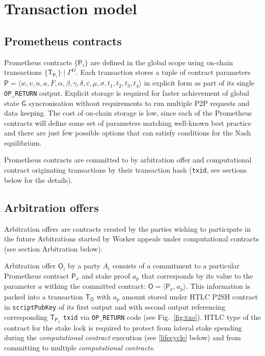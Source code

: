 \documentclass[a4paper]{article}
\begin{document}
\section{Transaction model}
\label{transaction_model}

\subsection{Prometheus contracts}
\label{p_contracts}

Prometheus contracts $\{\mathsf{P}_i\}$ are defined in the global scope using on-chain transactions $\{ \mathsf{T}_{\mathsf{P}_i} \} \mid\Gamma^\Omega$. Each transaction stores a tuple of contract parameters $\mathsf{P} = \langle w, v, n, a, F, \alpha, \beta,  \gamma, \delta, \varepsilon, \mu, \sigma, t_1, t_2, t_3, t_4 \rangle$ in explicit form as part of its single \texttt{OP\_RETURN} output. Explicit storage is required for faster achievement of global state $\mathsf{G}$ syncronisation without requirements to run multiple P2P requests and data keeping. The cost of on-chain storage is low, since each of the Prometheus contracts will define some set of parameters matching well-known best practice and there are just few possible options that can satisfy conditions for the Nash equilibrium.

Prometheus contracts are committed to by arbitration offer and computational contract originating transactions by their transaction hash (\texttt{txid}, see sections below for the details).

\subsection{Arbitration offers}
\label{o_contracts}

Arbitration offers are contracts created by the parties wishing to participate in the future Arbitrations started by Worker appeals under computational contracts (see section Arbitration below).

Arbitration offer $\mathsf{O}_i$ by a party $A_i$ consists of a commitment to a particular Prometheus contract $\mathsf{P}_x$ and stake proof $a_p$ that corresponds by its value to the parameter $a$ withing the committed contract: $\mathsf{O} = \langle \mathsf{P}_x, a_p \rangle$. This information is packed into a transaction $\mathsf{T_O}$ with $a_p$ amount stored under HTLC P2SH contract in \texttt{scriptPubKey} of its first output and with second output referencing corresponding $\mathsf{T}_{\mathsf{P}_x}$ \texttt{txid} via \texttt{OP\_RETURN}  code (see Fig.~\ref{fig:txo}). HTLC type of the contract for the stake lock is required to protect from lateral stake spending during the \textit{computational contract} execution (see \ref{lifecycle} below) and from committing to multiple \textit{computational contracts}.
\end{document}
